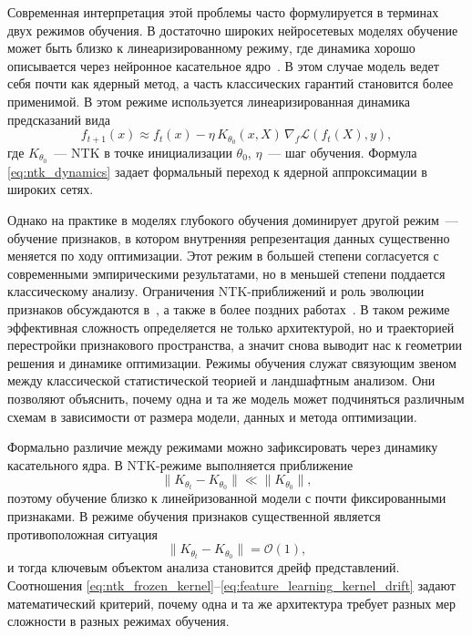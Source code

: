 \documentclass[russian]{intsys}
\begin{document}
Современная интерпретация этой проблемы часто формулируется в терминах двух режимов обучения.
В достаточно широких нейросетевых моделях обучение может быть близко к линеаризированному режиму, где динамика хорошо описывается через нейронное касательное ядро~\cite{jacot2018neural,adlam2020ntkhighdim,uniform2021ntk}.
В этом случае модель ведет себя почти как ядерный метод, а часть классических гарантий становится более применимой.
В этом режиме используется линеаризированная динамика предсказаний вида
\begin{equation}
f_{t+1}(x)\approx f_t(x)-\eta\,K_{\theta_0}(x,X)\,\nabla_f\mathcal L\!\left(f_t(X),y\right),
\label{eq:ntk_dynamics}
\end{equation}
где $K_{\theta_0}$~--- NTK в точке инициализации $\theta_0$, $\eta$~--- шаг обучения.
Формула \eqref{eq:ntk_dynamics} задает формальный переход к ядерной аппроксимации в широких сетях.

Однако на практике в моделях глубокого обучения доминирует другой режим~--- обучение признаков, в котором внутренняя репрезентация данных существенно меняется по ходу оптимизации.
Этот режим в большей степени согласуется с современными эмпирическими результатами, но в меньшей степени поддается классическому анализу. Ограничения NTK-приближений и роль эволюции признаков обсуждаются в~\cite{arora2019finegrained,featurevskernel2020}, а также в более поздних работах~\cite{leaveoneout2022,seleznova2022ntklimits}.
В таком режиме эффективная сложность определяется не только архитектурой, но и траекторией перестройки признакового пространства, а значит снова выводит нас к геометрии решения и динамике оптимизации.
Режимы обучения служат связующим звеном между классической статистической теорией и ландшафтным анализом.
Они позволяют объяснить, почему одна и та же модель может подчиняться различным схемам в зависимости от размера модели, данных и метода оптимизации.

Формально различие между режимами можно зафиксировать через динамику касательного ядра. В NTK-режиме выполняется приближение
\begin{equation}
\|K_{\theta_t}-K_{\theta_0}\| \ll \|K_{\theta_0}\|,
\label{eq:ntk_frozen_kernel}
\end{equation}
поэтому обучение близко к линейризованной модели с почти фиксированными признаками. В режиме обучения признаков существенной является противоположная ситуация
\begin{equation}
\|K_{\theta_t}-K_{\theta_0}\| = \mathcal O(1),
\label{eq:feature_learning_kernel_drift}
\end{equation}
и тогда ключевым объектом анализа становится дрейф представлений. Соотношения \eqref{eq:ntk_frozen_kernel}--\eqref{eq:feature_learning_kernel_drift} задают математический критерий, почему одна и та же архитектура требует разных мер сложности в разных режимах обучения.
\end{document}
